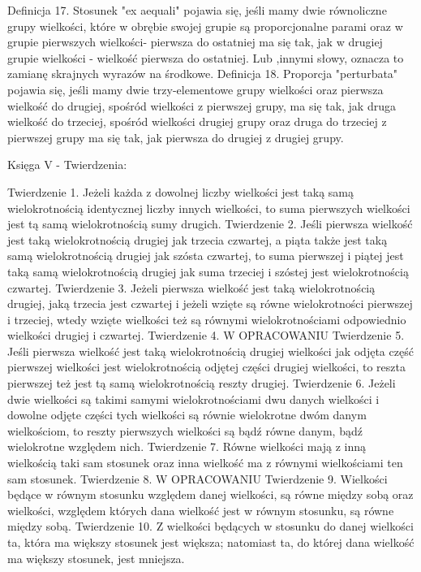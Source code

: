 Definicja 17.
    Stosunek "ex aequali" pojawia się, jeśli mamy dwie równoliczne grupy wielkości, które w obrębie swojej grupie są proporcjonalne parami oraz w grupie pierwszych wielkości- pierwsza do ostatniej ma się tak, jak w drugiej grupie wielkości - wielkość pierwsza do ostatniej. Lub ,innymi słowy, oznacza to zamianę skrajnych wyrazów na środkowe.
Definicja 18.
    Proporcja "perturbata" pojawia się, jeśli mamy dwie trzy-elementowe grupy wielkości oraz pierwsza wielkość do drugiej, spośród wielkości z pierwszej grupy, ma się tak, jak druga wielkość do trzeciej, spośród wielkości drugiej grupy oraz druga do trzeciej z pierwszej grupy ma się tak, jak pierwsza do drugiej z drugiej grupy.


Księga V - Twierdzenia:

Twierdzenie 1.
    Jeżeli każda z dowolnej liczby wielkości jest taką samą wielokrotnością identycznej liczby innych wielkości, to suma pierwszych wielkości jest tą samą wielokrotnością sumy drugich.
Twierdzenie 2.
    Jeśli pierwsza wielkość jest taką wielokrotnością drugiej jak trzecia czwartej, a piąta także jest taką samą wielokrotnością drugiej jak szósta czwartej, to suma pierwszej i piątej jest taką samą wielokrotnością drugiej jak suma trzeciej i szóstej jest wielokrotnością czwartej.
Twierdzenie 3.
    Jeżeli pierwsza wielkość jest taką wielokrotnością drugiej, jaką trzecia jest czwartej i jeżeli wzięte są równe wielokrotności pierwszej i trzeciej, wtedy wzięte wielkości też są równymi wielokrotnościami odpowiednio wielkości drugiej i czwartej.
Twierdzenie 4.
W OPRACOWANIU
Twierdzenie 5.
    Jeśli pierwsza wielkość jest taką wielokrotnością drugiej wielkości jak odjęta część pierwszej wielkości jest wielokrotnością odjętej części drugiej wielkości, to reszta pierwszej też jest tą samą wielokrotnością reszty drugiej.
Twierdzenie 6.
    Jeżeli dwie wielkości są takimi samymi wielokrotnościami dwu danych wielkości i dowolne odjęte części tych wielkości są równie wielokrotne dwóm danym wielkościom, to reszty pierwszych wielkości są bądź równe danym, bądź wielokrotne względem nich.
Twierdzenie 7.
    Równe wielkości mają z inną wielkością taki sam stosunek oraz inna wielkość ma z równymi wielkościami ten sam stosunek.
Twierdzenie 8.
W OPRACOWANIU
Twierdzenie 9.
    Wielkości będące w równym stosunku względem danej wielkości, są równe między sobą oraz wielkości, względem których dana wielkość jest w równym stosunku, są równe między sobą.
Twierdzenie 10.
    Z wielkości będących w stosunku do danej wielkości ta, która ma większy stosunek jest większa; natomiast ta, do której dana wielkość ma większy stosunek, jest mniejsza.
